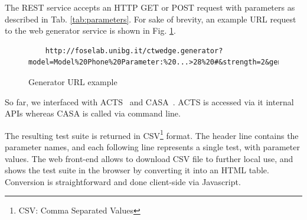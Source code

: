 \begin{tikzborder}{\cite{Gargantini16:validation}}
\begin{tikzborder}{\cite{gargantini_combinatorial_2017}}
\begin{tikzborder}{\cite{garn2019}}
\begin{tikzborder}{\cite{arcaini2019achieving}}
\begin{table}[!htb]
	\caption{Request parameters to \ctwedge generation service}
	\centering
	\footnotesize
	\label{tab:parameters}
\end{table}

\begin{tikzborder}{}
The REST service accepts an HTTP GET or POST request with parameters as described in Tab. \ref{tab:parameters}.
For sake of brevity, an example URL request to the web generator service is shown in Fig. \ref{fig:urlexample}.
\end{tikzborder}

\begin{figure}[htb!] %
	\centering
	\begin{lstlisting}
	http://foselab.unibg.it/ctwedge.generator?model=Model%20Phone%20Parameter:%20...>28%20#&strength=2&generator=acts&ignConstr=false	
	\end{lstlisting}
	\caption{Generator URL example}
	\label{fig:urlexample}
\end{figure}

\begin{tikzborder}{}
So far, we interfaced \ctwedge with ACTS~\cite{ACTS} and CASA~\cite{CASAwebsite}. ACTS is accessed  via it internal APIs whereas CASA is called via command line.

The resulting test suite is returned in CSV\footnote{CSV: Comma Separated Values} format. The header line contains the parameter names, and each following line represents a single test, with parameter values.
The web front-end allows to download CSV file to further local use, and shows the test suite in the browser by converting it into an HTML table. Conversion is straightforward and done client-side via Javascript.


\end{tikzborder}
\end{tikzborder}
\end{tikzborder}
\end{tikzborder}
\end{tikzborder}
